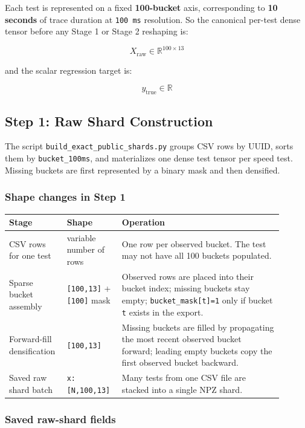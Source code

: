 \documentclass[11pt]{article}
\newcommand{\toprule}{\hline}
\newcommand{\midrule}{\hline}
\newcommand{\bottomrule}{\hline}
\begin{document}
Each test is represented on a fixed \textbf{100-bucket} axis, corresponding to \textbf{10 seconds} of trace duration at \texttt{100 ms} resolution. So the canonical per-test dense tensor before any Stage 1 or Stage 2 reshaping is:

\[
X_{\text{raw}} \in \mathbb{R}^{100 \times 13}
\]

and the scalar regression target is:

\[
y_{\text{true}} \in \mathbb{R}
\]

\subsection{Step 1: Raw Shard Construction}

The script \texttt{build\_exact\_public\_shards.py} groups CSV rows by UUID, sorts them by \texttt{bucket\_100ms}, and materializes one dense test tensor per speed test. Missing buckets are first represented by a binary mask and then densified.

\subsubsection*{Shape changes in Step 1}

\begin{center}
\begin{tabular}{p{0.17\linewidth} p{0.18\linewidth} p{0.55\linewidth}}
\toprule
\textbf{Stage} & \textbf{Shape} & \textbf{Operation} \\
\midrule
CSV rows for one test & variable number of rows & One row per observed bucket. The test may not have all 100 buckets populated. \\
Sparse bucket assembly & \texttt{[100,13]} + \texttt{[100]} mask & Observed rows are placed into their bucket index; missing buckets stay empty; \texttt{bucket\_mask[t]=1} only if bucket \texttt{t} exists in the export. \\
Forward-fill densification & \texttt{[100,13]} & Missing buckets are filled by propagating the most recent observed bucket forward; leading empty buckets copy the first observed bucket backward. \\
Saved raw shard batch & \texttt{x:[N,100,13]} & Many tests from one CSV file are stacked into a single NPZ shard. \\
\bottomrule
\end{tabular}
\end{center}

\subsubsection*{Saved raw-shard fields}
\end{document}
